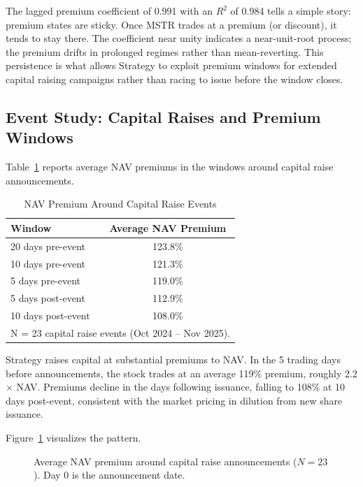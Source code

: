 The lagged premium coefficient of 0.991 with an $R^2$ of 0.984 tells a simple story: premium states are sticky. Once MSTR trades at a premium (or discount), it tends to stay there. The coefficient near unity indicates a near-unit-root process; the premium drifts in prolonged regimes rather than mean-reverting. This persistence is what allows Strategy to exploit premium windows for extended capital raising campaigns rather than racing to issue before the window closes.

\subsection{Event Study: Capital Raises and Premium Windows}

Table~\ref{tab:event_study} reports average NAV premiums in the windows around capital raise announcements.

\begin{table}[H]
\centering
\caption{NAV Premium Around Capital Raise Events}
\label{tab:event_study}
\begin{tabular}{@{}lc@{}}
\toprule
\textbf{Window} & \textbf{Average NAV Premium} \\
\midrule
20 days pre-event & 123.8\% \\
10 days pre-event & 121.3\% \\
5 days pre-event & 119.0\% \\
5 days post-event & 112.9\% \\
10 days post-event & 108.0\% \\
\bottomrule
\multicolumn{2}{l}{\footnotesize N = 23 capital raise events (Oct 2024 -- Nov 2025).}
\end{tabular}
\end{table}

Strategy raises capital at substantial premiums to NAV. In the 5 trading days before announcements, the stock trades at an average 119\% premium, roughly 2.2$\times$ NAV. Premiums decline in the days following issuance, falling to 108\% at 10 days post-event, consistent with the market pricing in dilution from new share issuance.

Figure~\ref{fig:event_study} visualizes the pattern.

\begin{figure}[H]
    \centering
    \caption[NAV Premium Around Capital Raise Announcements]{Average NAV premium around capital raise announcements ($N = 23$). Day 0 is the announcement date.}
    \label{fig:event_study}
\end{figure}

